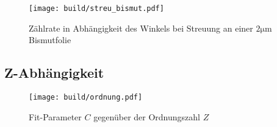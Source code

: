 \begin{figure}
  \centering
  \texttt{[image: build/streu\_bismut.pdf]}
  \caption{Zählrate in Abhängigkeit des Winkels bei Streuung an einer $2\si{\micro\meter}$ Bismutfolie}
  \label{fig:streu_bismut}
\end{figure}

\subsection{Z-Abhängigkeit}

\begin{figure}
  \centering
  \texttt{[image: build/ordnung.pdf]}
  \caption{Fit-Parameter $C$ gegenüber der Ordnungszahl $Z$}
  \label{fig:ordnung}
\end{figure}